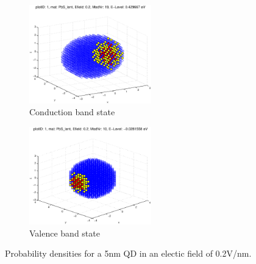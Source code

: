 \begin{figure}
	\centering
	\begin{subfigure}{200px}
		\includegraphics[width=200px]{Fig/Plots/r25v02CB}
		\caption{Conduction band state}
	\end{subfigure}
	\begin{subfigure}{200px}
		\includegraphics[width=200px]{Fig/Plots/r25v02VB}
		\caption{Valence band state}
	\end{subfigure}	
	\caption{Probability densities for a 5nm QD in an electic field of 0.2V/nm.}
	\label{fig:EfieldWaveFn}
\end{figure}
%
